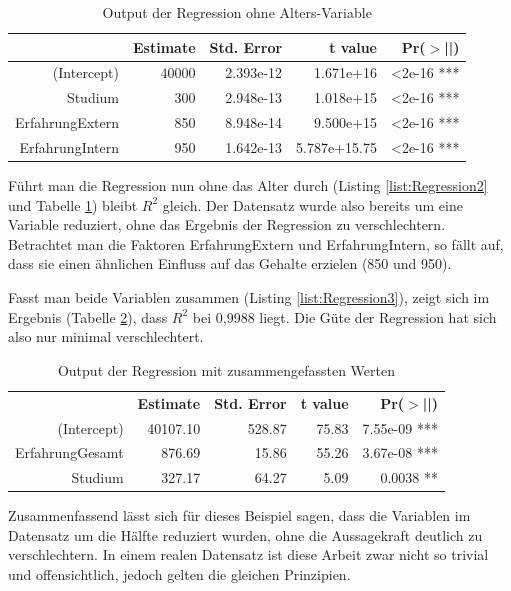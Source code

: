 
\begin{table}[H]
\begin{tabular}{|rrrrr|}
  \hhline{=====}
 & \textbf{Estimate} & \textbf{Std. Error} & \textbf{t value} & \textbf{Pr($>$||)} \\
  \hline
(Intercept) & 40000 & 2.393e-12 & 1.671e+16 & <2e-16 *** \\ 
  Studium & 300 & 2.948e-13 & 1.018e+15 & <2e-16 *** \\ 
  ErfahrungExtern & 850 & 8.948e-14 & 9.500e+15 & <2e-16 *** \\ 
  ErfahrungIntern & 950 & 1.642e-13 & 5.787e+15.75 & <2e-16 *** \\ 
\hline
\end{tabular}
\caption{Output der Regression ohne Alters-Variable}
\label{tab:Regression2:output}
\end{table}
Führt man die Regression nun ohne das Alter durch (Listing \ref{list:Regression2} und Tabelle \ref{tab:Regression2:output}) bleibt $R^2$ gleich. Der Datensatz wurde also bereits um eine Variable reduziert, ohne das Ergebnis der Regression zu verschlechtern.\newline
Betrachtet man die Faktoren ErfahrungExtern und ErfahrungIntern, so fällt auf, dass sie einen ähnlichen Einfluss auf das Gehalte erzielen (850 und 950). 

Fasst man beide Variablen zusammen (Listing \ref{list:Regression3}), zeigt sich im Ergebnis (Tabelle \ref{tab:Regression3:output}), dass $R^2$ bei 0,9988 liegt. Die Güte der Regression hat sich also nur minimal verschlechtert.
\begin{table}[H]
\begin{tabular}{|rrrrr|}
  \hline
 & \textbf{Estimate} & \textbf{Std. Error} & \textbf{t value} & \textbf{Pr($>$||)} \\
  \hhline{=====}
(Intercept) & 40107.10 & 528.87 & 75.83 & 7.55e-09 *** \\
ErfahrungGesamt & 876.69 & 15.86 & 55.26 & 3.67e-08 ***\\ 
Studium & 327.17 & 64.27 & 5.09 & 0.0038 **\\ 
\hline
\end{tabular}
\caption{Output der Regression mit zusammengefassten Werten}
\label{tab:Regression3:output}
\end{table}
Zusammenfassend lässt sich für dieses Beispiel sagen, dass die Variablen im Datensatz um die Hälfte reduziert wurden, ohne die Aussagekraft deutlich zu verschlechtern. In einem realen Datensatz ist diese Arbeit zwar nicht so trivial und offensichtlich, jedoch gelten die gleichen Prinzipien.\newline
